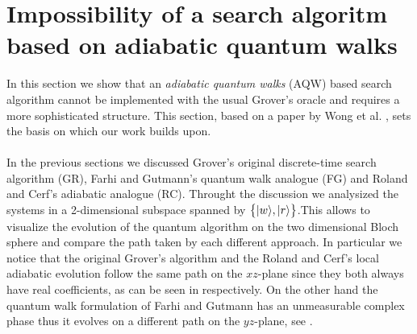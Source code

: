 \section{Impossibility of a search algoritm based on adiabatic quantum walks}\label{impossibility}
In this section we show that an \textit{adiabatic quantum walks} (AQW) based search algorithm cannot be implemented with the usual Grover's oracle and requires a more sophisticated structure. This section, based on a paper by Wong et al. \cite{Wong2016}, sets the basis on which our work builds upon. \\ \\
In the previous sections we discussed Grover's original discrete-time search algorithm (GR), Farhi and Gutmann's quantum walk analogue (FG) and Roland and Cerf's adiabatic analogue (RC). Throught the discussion we analysized the systems in a 2-dimensional subspace spanned by $\big\{{|{w}\rangle}, {|{r}\rangle}\big\}$.This allows to visualize the evolution of the quantum algorithm on the two dimensional Bloch sphere and compare the path taken by each different approach. In particular we notice that the original Grover's algorithm and the Roland and Cerf's local adiabatic evolution follow the same path on the $xz$-plane since they both always have real coefficients, as can be seen in  respectively. On the other hand the quantum walk formulation of Farhi and Gutmann has an unmeasurable complex phase thus it evolves on a different path on the $yz$-plane, see .
